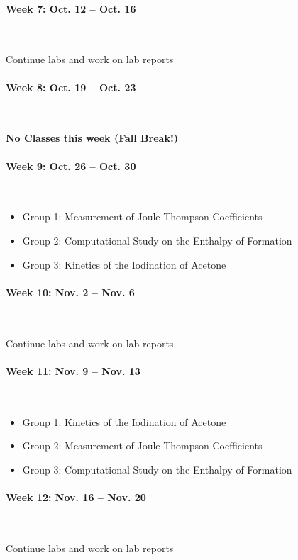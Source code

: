 \documentclass[12pt, letterpaper]{article}
\begin{document}
\paragraph{Week 7: Oct. 12 -- Oct. 16}~

Continue labs and work on lab reports

\paragraph{Week 8: Oct. 19 -- Oct. 23}~

\textbf{No Classes this week (Fall Break!)}

\paragraph{Week 9: Oct. 26 -- Oct. 30}~

\begin{itemize}
	\item Group 1: Measurement of Joule-Thompson Coefficients
	\item Group 2: Computational Study on the Enthalpy of Formation
	\item Group 3: Kinetics of the Iodination of Acetone
\end{itemize}

\paragraph{Week 10: Nov. 2 -- Nov. 6}~

Continue labs and work on lab reports

\paragraph{Week 11: Nov. 9 -- Nov. 13}~

\begin{itemize}
	\item Group 1: Kinetics of the Iodination of Acetone
	\item Group 2: Measurement of Joule-Thompson Coefficients
	\item Group 3: Computational Study on the Enthalpy of Formation
\end{itemize}

\paragraph{Week 12: Nov. 16 -- Nov. 20}~

Continue labs and work on lab reports
\end{document}
